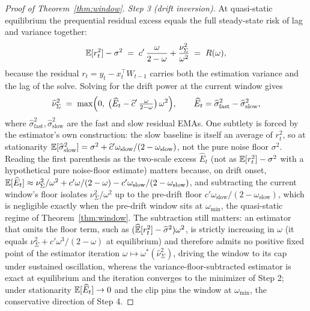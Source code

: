 \begin{proof}[Proof of Theorem~\ref{thm:window}]
\emph{Step 3 (drift inversion).}
At quasi-static equilibrium the prequential residual excess equals the full steady-state risk of lag and variance together:
\[
  \mathbb{E}[r_t^2] - \sigma^2
  \;=\; c'\,\frac{\omega}{2-\omega} + \frac{\nu^2_\Sigma}{\omega^2}
  \;=\; R(\omega),
\]
because the residual $r_t = y_t - x_t^\top W_{t-1}$ carries both the estimation variance and the lag of the solve.
Solving for the drift power at the current window gives
\[
  \widehat\nu^2_\Sigma
  \;=\; \max\Bigl(0,\;\bigl(\widehat E_t - \widehat c'\,\tfrac{\omega}{2-\omega}\bigr)\,\omega^2\Bigr),
  \qquad
  \widehat E_t = \widehat\sigma^2_{\mathrm{fast}} - \widehat\sigma^2_{\mathrm{slow}},
\]
where $\widehat\sigma^2_{\mathrm{fast}}, \widehat\sigma^2_{\mathrm{slow}}$ are the fast and slow residual EMAs.
One subtlety is forced by the estimator's own construction: the slow baseline is itself an average of $r_t^2$, so at stationarity $\mathbb{E}[\widehat\sigma^2_{\mathrm{slow}}] = \sigma^2 + \widehat c' \omega_{\mathrm{slow}}/(2 - \omega_{\mathrm{slow}})$, not the pure noise floor $\sigma^2$.
Reading the first parenthesis as the two-scale excess $\widehat E_t$ (not as $\mathbb{E}[r_t^2] - \sigma^2$ with a hypothetical pure noise-floor estimate) matters because, on drift onset, $\mathbb{E}[\widehat E_t] \approx \nu^2_\Sigma/\omega^2 + c'\omega/(2-\omega) - c'\omega_{\mathrm{slow}}/(2-\omega_{\mathrm{slow}})$, and subtracting the current window's floor isolates $\nu^2_\Sigma/\omega^2$ up to the pre-drift floor $c'\omega_{\mathrm{slow}}/(2-\omega_{\mathrm{slow}})$, which is negligible exactly when the pre-drift window sits at $\omega_{\min}$, the quasi-static regime of Theorem~\ref{thm:window}.
The subtraction still matters: an estimator that omits the floor term, such as $(\widehat{\mathbb{E}}[r_t^2] - \widehat\sigma^2)\omega^2$, is strictly increasing in $\omega$ (it equals $\nu^2_\Sigma + c'\omega^3/(2-\omega)$ at equilibrium) and therefore admits no positive fixed point of the estimator iteration $\omega \mapsto \omega^*(\widehat\nu^2_\Sigma)$, driving the window to its cap under sustained oscillation, whereas the variance-floor-subtracted estimator is exact at equilibrium and the iteration converges to the minimizer of Step 2; under stationarity $\mathbb{E}[\widehat E_t] \to 0$ and the clip pins the window at $\omega_{\min}$, the conservative direction of Step 4.


\end{proof}
